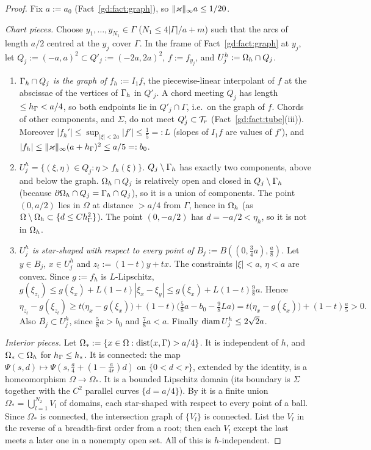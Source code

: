 \begin{proof}
Fix $a:=a_0$ (Fact~\ref{gd:fact:graph}), so $\lVert \varkappa\rVert_\infty a\le1/20$.

\emph{Chart pieces.} Choose $y_1,\dots,y_{N_1}\in\Gamma$ ($N_1\le4|\Gamma|/a+m$) such that the arcs of length $a/2$ centred at the $y_j$ cover $\Gamma$. In the frame of Fact~\ref{gd:fact:graph} at $y_j$, let $Q_j:=(-a,a)^2\subset Q'_j:=(-2a,2a)^2$, $f:=f_{y_j}$, and $U_j^h:=\Omega_h\cap Q_j$.
\begin{enumerate}
\item \emph{$\Gamma_h\cap Q_j$ is the graph of $f_h:=I_1f$}, the piecewise-linear interpolant of $f$ at the abscissae of the vertices of $\Gamma_h$ in $Q'_j$. A chord meeting $Q_j$ has length $\le h_\Gamma<a/4$, so both endpoints lie in $Q'_j\cap\Gamma$, i.e.\ on the graph of $f$. Chords of other components, and $\Sigma$, do not meet $Q'_j\subset\mathcal T_r$ (Fact~\ref{gd:fact:tube}(iii)). Moreover $|f_h'|\le\sup_{|\xi|<2a}|f'|\le\frac15=:L$ (slopes of $I_1f$ are values of $f'$), and $|f_h|\le\lVert \varkappa\rVert_\infty(a+h_\Gamma)^2\le a/5=:b_0$.
\item \emph{$U_j^h=\{(\xi,\eta)\in Q_j:\eta>f_h(\xi)\}$.} $Q_j\setminus\Gamma_h$ has exactly two components, above and below the graph. $\Omega_h\cap Q_j$ is relatively open and closed in $Q_j\setminus\Gamma_h$ (because $\partial\Omega_h\cap Q_j=\Gamma_h\cap Q_j$), so it is a union of components. The point $(0,a/2)$ lies in $\Omega$ at distance $>a/4$ from $\Gamma$, hence in $\Omega_h$ (as $\Omega\setminus\Omega_h\subset\{d\le Ch_\Gamma^2\}$). The point $(0,-a/2)$ has $d=-a/2<\eta_h$, so it is not in $\Omega_h$.
\item \emph{$U_j^h$ is star-shaped with respect to every point of $B_j:=B((0,\frac34a),\frac a8)$.} Let $y\in B_j$, $x\in U_j^h$ and $z_t:=(1-t)y+tx$. The constraints $|\xi|<a$, $\eta<a$ are convex. Since $g:=f_h$ is $L$-Lipschitz, $g(\xi_{z_t})\le g(\xi_x)+L(1-t)|\xi_x-\xi_y|\le g(\xi_x)+L(1-t)\tfrac98a$. Hence
\[
\eta_{z_t}-g(\xi_{z_t})\ge t\bigl(\eta_x-g(\xi_x)\bigr)+(1-t)\bigl(\tfrac58a-b_0-\tfrac98La\bigr)=t\bigl(\eta_x-g(\xi_x)\bigr)+(1-t)\tfrac a5>0 .
\]
Also $\overline{B_j}\subset U_j^h$, since $\frac58a>b_0$ and $\frac78a<a$. Finally $\operatorname{diam} U_j^h\le2\sqrt2a$.
\end{enumerate}

\emph{Interior pieces.} Let $\Omega_\ast:=\{x\in\Omega:\operatorname{dist}(x,\Gamma)>a/4\}$. It is independent of $h$, and $\Omega_\ast\subset\Omega_h$ for $h_\Gamma\le h_\ast$. It is connected: the map $\Psi(s,d)\mapsto\Psi(s,\frac a4+(1-\frac a{4r})d)$ on $\{0<d<r\}$, extended by the identity, is a homeomorphism $\Omega\to\Omega_\ast$. It is a bounded Lipschitz domain (its boundary is $\Sigma$ together with the $C^2$ parallel curves $\{d=a/4\}$). %
By \cite[Lemma~II.1.3]{Galdi} it is a finite union $\Omega_\ast=\bigcup_{l=1}^{N_2}V_l$ of domains, each star-shaped with respect to every point of a ball. Since $\Omega_\ast$ is connected, the intersection graph of $\{V_l\}$ is connected. List the $V_l$ in the reverse of a breadth-first order from a root; then each $V_l$ except the last meets a later one in a nonempty open set. All of this is $h$-independent.


\end{proof}

